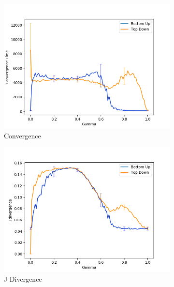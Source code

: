 \begin{figure}[h!]
 \centering
  \begin{subfigure}[ht]{0.45\textwidth}
    \includegraphics[width=\textwidth]{Images/Figures/BU+TD/FIE/Convergence_better.png}
    \caption{Convergence}
 \end{subfigure}
 \hfill
 \begin{subfigure}[ht]{0.45\textwidth}
    \includegraphics[width=\textwidth]{Images/Figures/BU+TD/FIE/J-Div_better.png}
    \caption{J-Divergence}
 \end{subfigure}
 \begin{subfigure}[ht]{0.45\textwidth}

\end{subfigure}
\end{figure}
